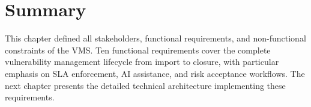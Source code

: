 \section{Summary}

This chapter defined all stakeholders, functional requirements, and non-functional constraints of the VMS. Ten functional requirements cover the complete vulnerability management lifecycle from import to closure, with particular emphasis on SLA enforcement, AI assistance, and risk acceptance workflows. The next chapter presents the detailed technical architecture implementing these requirements.
